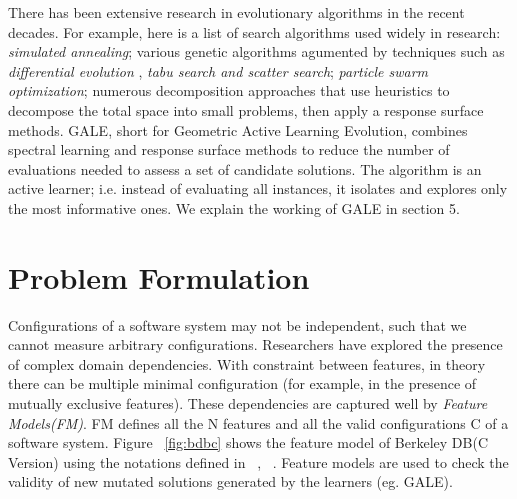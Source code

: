 \documentclass{sig-alternative}
\begin{document}
    There has been extensive research in evolutionary algorithms in the recent decades. For example, here is a list of search algorithms used widely in research: \textit{simulated annealing}\cite{bell2013limited, menzies2007business}; various genetic algorithms\cite{goldberg1979complexity} agumented by techniques such as \textit{differential evolution} \cite{storn1997differential}, \textit{tabu search and scatter search}\cite{nebro2008abyss, molina2007sspmo, glover1986general, beausoleil2006moss}; \textit{particle swarm optimization}\cite{pan2008particle}; numerous decomposition approaches that use heuristics to decompose the total space into small problems, then apply a response surface methods\cite{krall2014gale, zuluaga2013active}. GALE, short for Geometric Active Learning Evolution,
combines spectral learning and response surface methods
to reduce the number of evaluations needed to assess a set
of candidate solutions. The algorithm is an active learner;
i.e. instead of evaluating all instances, it isolates and explores
only the most informative ones. We explain the working of GALE in section 5.




\section{Problem Formulation}


    Configurations of a software system may not be independent, such that we cannot measure arbitrary configurations. Researchers have explored the presence of complex domain dependencies. With constraint between features, in theory there can be multiple minimal configuration (for example, in the presence of mutually exclusive features). These dependencies are captured well by \textit{Feature Models(FM)}. FM defines all the N features and all the valid configurations C of a software system. Figure ~\ref{fig:bdbc}  shows the feature model of Berkeley DB(C Version) using the notations defined in ~\cite{kang1990feature}, ~\cite{guo2012consistency}. Feature models are used to check the validity of new mutated solutions generated by the learners (eg. GALE).
    
\end{document}

